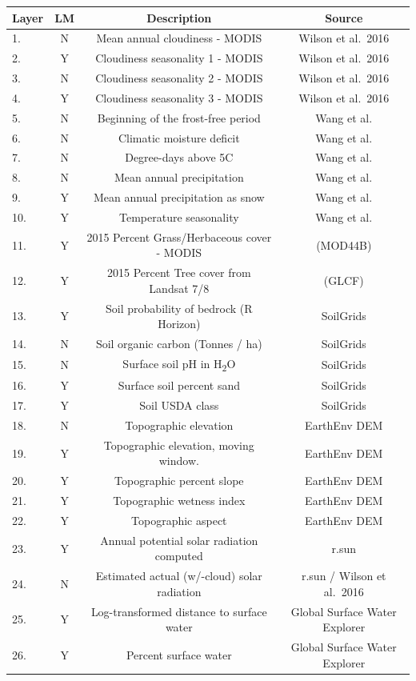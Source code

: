 \documentclass[
]{article}
\begin{document}
\begin{longtable}[]{@{}lccc@{}}
\toprule()
Layer & LM & Description & Source \\
\midrule()
\endhead
1. & N & Mean annual cloudiness - MODIS & Wilson et al.~2016 \\
2. & Y & Cloudiness seasonality 1 - MODIS & Wilson et al.~2016 \\
3. & N & Cloudiness seasonality 2 - MODIS & Wilson et al.~2016 \\
4. & Y & Cloudiness seasonality 3 - MODIS & Wilson et al.~2016 \\
5. & N & Beginning of the frost-free period & Wang et al. \\
6. & N & Climatic moisture deficit & Wang et al. \\
7. & N & Degree-days above 5C & Wang et al. \\
8. & N & Mean annual precipitation & Wang et al. \\
9. & Y & Mean annual precipitation as snow & Wang et al. \\
10. & Y & Temperature seasonality & Wang et al. \\
11. & Y & 2015 Percent Grass/Herbaceous cover - MODIS & (MOD44B) \\
12. & Y & 2015 Percent Tree cover from Landsat 7/8 & (GLCF) \\
13. & Y & Soil probability of bedrock (R Horizon) & SoilGrids \\
14. & N & Soil organic carbon (Tonnes / ha) & SoilGrids \\
15. & N & Surface soil pH in H\textsubscript{2}O & SoilGrids \\
16. & Y & Surface soil percent sand & SoilGrids \\
17. & Y & Soil USDA class & SoilGrids \\
18. & N & Topographic elevation & EarthEnv DEM \\
19. & Y & Topographic elevation, moving window. & EarthEnv DEM \\
20. & Y & Topographic percent slope & EarthEnv DEM \\
21. & Y & Topographic wetness index & EarthEnv DEM \\
22. & Y & Topographic aspect & EarthEnv DEM \\
23. & Y & Annual potential solar radiation computed & r.sun \\
24. & N & Estimated actual (w/-cloud) solar radiation & r.sun / Wilson
et al.~2016 \\
25. & Y & Log-transformed distance to surface water & Global Surface
Water Explorer \\
26. & Y & Percent surface water & Global Surface Water Explorer \\
\bottomrule()
\end{longtable}
\end{document}
